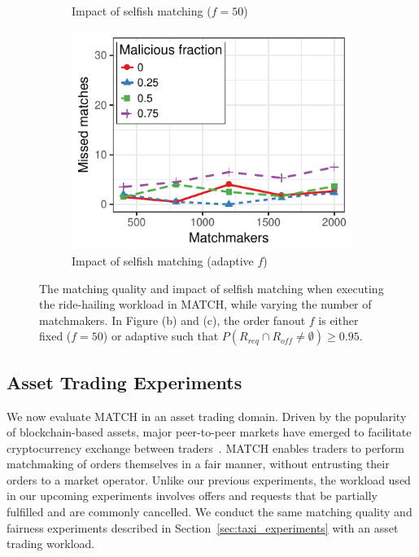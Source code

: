 \begin{figure}[t!]
\begin{subfigure}{.5\columnwidth}
		\caption{Impact of selfish matching ($ f = 50 $)}
		\label{fig:asset_trading_fairness_fixed}
	\end{subfigure}\vspace{0.3cm}
	\begin{subfigure}{.5\columnwidth}
		\centering
		\includegraphics[width=\columnwidth]{match/assets/plots/asset_trading_fairness_adaptive.pdf}
		\caption{Impact of selfish matching (adaptive $ f $)}
		\label{fig:asset_trading_fairness_adaptive}
	\end{subfigure}
	\caption{The matching quality and impact of selfish matching when executing the ride-hailing workload in MATCH, while varying the number of matchmakers. In Figure (b) and (c), the order fanout $ f $ is either fixed  ($ f = 50 $) or adaptive such that $ P(R_{req} \cap R_{off} \neq \emptyset) \geq 0.95 $.}
	\label{fig:asset_trading_experiments}
\end{figure}

\subsection{Asset Trading Experiments}
\label{sec:asset_trading_experiments}
We now evaluate MATCH in an asset trading domain.
Driven by the popularity of blockchain-based assets, major peer-to-peer markets have emerged to facilitate cryptocurrency exchange between traders~\cite{bentov2019tesseract}.
MATCH enables traders to perform matchmaking of orders themselves in a fair manner, without entrusting their orders to a market operator.
Unlike our previous experiments, the workload used in our upcoming experiments involves offers and requests that be partially fulfilled and are commonly cancelled.
We conduct the same matching quality and fairness experiments described in Section~\ref{sec:taxi_experiments} with an asset trading workload. %

